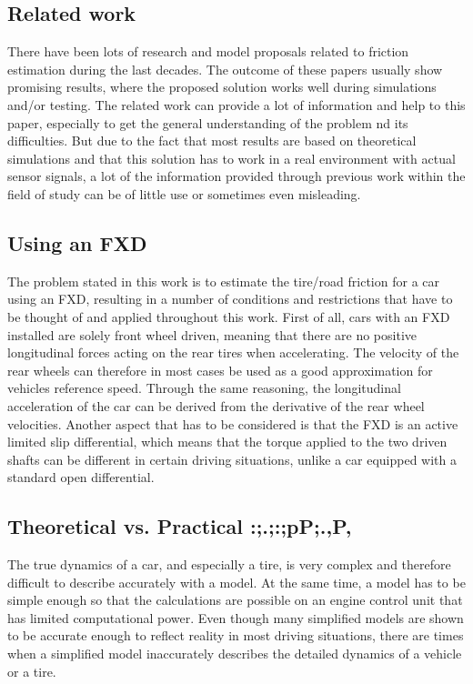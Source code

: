 \subsection{Related work}

There have been lots of research and model proposals related to friction estimation during the last decades. The outcome of these papers usually show promising results, where the proposed solution works well during simulations and/or testing. The related work can provide a lot of information and help to this paper, especially to get the general understanding of the problem nd its difficulties. But due to the fact that most results are based on theoretical simulations and that this solution has to work in a real environment with actual sensor signals, a lot of the information provided through previous work within the field of study can be of little use or sometimes even misleading.

\subsection{Using an FXD}

The problem stated in this work is to estimate the tire/road friction for a car using an FXD, resulting in a number of conditions and restrictions that have to be thought of and applied throughout this work. First of all, cars with an FXD installed are solely front wheel driven, meaning that there are no positive longitudinal forces acting on the rear tires when accelerating. The velocity of the rear wheels can therefore in most cases be used as a good approximation for vehicles reference speed. Through the same reasoning, the longitudinal acceleration of the car can be derived from the derivative of the rear wheel velocities. Another aspect that has to be considered is that the FXD is an active limited slip differential, which means that the torque applied to the two driven shafts can be different in certain driving situations, unlike a car equipped with a standard open differential. 

\subsection{Theoretical vs. Practical :;.;:;pP;.,P,}

The true dynamics of a car, and especially a tire, is very complex and therefore difficult to describe accurately with a model. At the same time, a model has to be simple enough so that the calculations are possible on an engine control unit that has limited computational power. Even though many simplified models are shown to be accurate enough to reflect reality in most driving situations, there are times when a simplified model inaccurately describes the detailed dynamics of a vehicle or a tire. 

